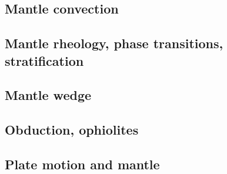 \subsection*{Mantle convection}

\cite{hemw75}
\cite{ludt79}
\cite{olco80}\cite{jamc80}
\cite{jape82}\cite{homc82}
\cite{hous83}\cite{hous83b}
\cite{olyb84}\cite{jarv84}\cite{haeb84}\cite{harp84}\cite{davi84}
\cite{jarv85}
\cite{davi86}
\cite{yuqh87}
\cite{zhch93}\cite{jarv93}\cite{tack93}
\cite{haeb94}
\cite{zhgu95}
\cite{zhyu96}\cite{hond96}\cite{rytr96a}\cite{rytr96b}\cite{tack96}\cite{trbo96}
\cite{hond97}\cite{iwho97}
\cite{ande98}\cite{iwho98}\cite{devv98}\cite{tack98}\cite{tack98b}\cite{trha98b}\cite{trha98}
\cite{duyr99}
\cite{albe00}\cite{hayu00}\cite{devv00b}\cite{tack00b}\cite{zhzm00}
\cite{tasu02}
\cite{hapa03}
\cite{taxn05}
\cite{nake07}
\cite{tack08}
\cite{wodd09}
\cite{lowm11}\cite{rota11}\cite{woda11}
\cite{holj13}\cite{dadb13}\cite{toyd13}
\cite{arfw14}\cite{helo14}
\cite{thkp15}

\subsection*{Mantle rheology, phase transitions, stratification}

\cite{yusb82}
\cite{zhyh92}
\cite{tasg93}
\cite{zhyu95}
\cite{pazw07}
\cite{java11}
\cite{tack12}

\subsection*{Mantle wedge}

\cite{tosl78}
\cite{leki09}
\cite{roms10}
\cite{ledg14}

\subsection*{Obduction, ophiolites}

\cite{hack90}
\cite{hack91}
\cite{agzf14}

\subsection*{Plate motion and mantle}

